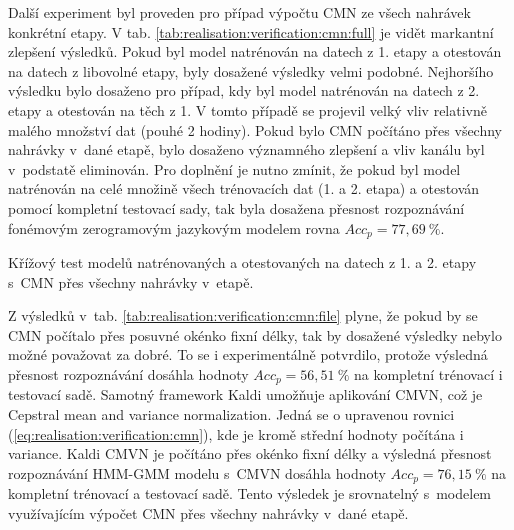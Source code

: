 Další experiment byl proveden pro případ výpočtu CMN ze všech nahrávek konkrétní etapy.
V tab. \ref{tab:realisation:verification:cmn:full} je vidět markantní zlepšení výsledků.
Pokud byl model natrénován na datech z 1. etapy a otestován na datech z libovolné etapy, byly dosažené výsledky velmi podobné.
Nejhoršího výsledku bylo dosaženo pro případ, kdy byl model natrénován na datech z 2. etapy a otestován na těch z 1.
V tomto případě se projevil velký vliv relativně malého množství dat (pouhé 2 hodiny).
Pokud bylo CMN počítáno přes všechny nahrávky v~dané etapě, bylo dosaženo významného zlepšení a vliv kanálu byl v~podstatě eliminován.
Pro doplnění je nutno zmínit, že pokud byl model natrénován na celé množině všech trénovacích dat (1. a 2. etapa) a otestován pomocí kompletní testovací sady, tak byla dosažena přesnost rozpoznávání fonémovým zerogramovým jazykovým modelem rovna $Acc_{p} = 77,69\ \%$.


\begin{table}[htpb]
  \centering
  \def\arraystretch{1.5}
  \caption[Křížový test s~CMN přes všechny nahrávky]{Křížový test modelů natrénovaných a otestovaných na datech z 1. a 2. etapy s~CMN  přes všechny nahrávky v~etapě.}
  \label{tab:realisation:verification:cmn:full}
\end{table}

Z výsledků v~tab. \ref{tab:realisation:verification:cmn:file} plyne, že pokud by se CMN počítalo přes posuvné okénko fixní délky, tak by dosažené výsledky nebylo možné považovat za dobré.
To se i experimentálně potvrdilo, protože výsledná přesnost rozpoznávání dosáhla hodnoty $Acc_{p} = 56,51\ \%$ na kompletní trénovací i testovací sadě.
Samotný framework Kaldi umožňuje aplikování CMVN, což je Cepstral mean and variance normalization.
Jedná se o upravenou rovnici (\ref{eq:realisation:verification:cmn}), kde je kromě střední hodnoty počítána i variance.
Kaldi CMVN je počítáno přes okénko fixní délky a výsledná přesnost rozpoznávání HMM-GMM modelu s~CMVN dosáhla hodnoty $Acc_{p} = 76,15\ \%$ na kompletní trénovací a testovací sadě.
Tento výsledek je srovnatelný s~modelem využívajícím výpočet CMN přes všechny nahrávky v~dané etapě.

